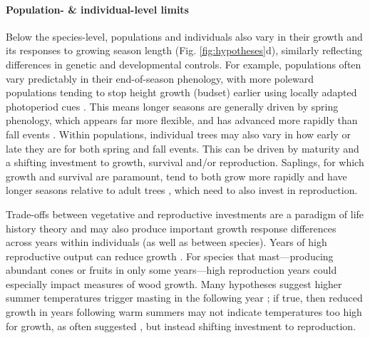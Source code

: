 \documentclass[11pt]{article}
\begin{document}
\paragraph{Population- \& individual-level limits}
Below the species-level, populations and individuals also vary in their growth and its responses to growing season length (Fig. \ref{fig:hypotheses}d), similarly reflecting differences in genetic and developmental controls. For example, populations often vary predictably in their end-of-season phenology, with more poleward populations tending to stop height growth (budset) earlier using locally adapted photoperiod cues \citep{soolanayakanahally2013timing,aitken2016}. This means longer seasons are generally driven by spring phenology, which appears far more flexible, and has advanced more rapidly than fall events \citep{aitken2016}. Within populations, individual trees may also vary in how early or late they are for both spring and fall events. This can be driven by maturity and a shifting investment to growth, survival and/or reproduction. Saplings, for which growth and survival are paramount, tend to both grow more rapidly \citep{hilty2021plant} and have longer seasons relative to adult trees \citep{augspurger2003differences,rozendaal2010tropical,vitasse2014earlier}, which need to also invest in reproduction. %

Trade-offs between vegetative and reproductive investments are a paradigm of life history theory and may also produce important growth response differences across years within individuals (as well as between species). Years of high reproductive output can reduce growth \citep{thomas2011bookchptr,hacket2016tree}. For species that mast---producing abundant cones or fruits in only some years---high reproduction years could especially impact measures of wood growth. Many hypotheses suggest higher summer temperatures trigger masting in the following year \citep{hacket2016tree,hacket2016consistent}; if true, then reduced growth in years following warm summers may not indicate temperatures too high for growth, as often suggested \citep[e.g.,][]{gantois2022new,dow2022warm}, but instead shifting investment to reproduction.
\end{document}
